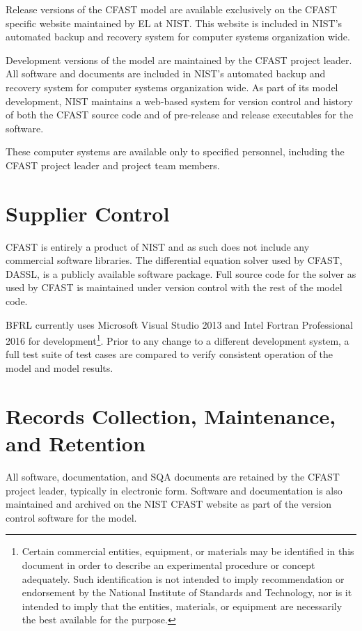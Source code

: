 \documentclass[12pt]{book}
\begin{document}
Release versions of the CFAST model are available exclusively on the CFAST specific website maintained by EL at NIST. This website is included in NIST's automated backup and recovery system for computer systems organization wide.

Development versions of the model are maintained by the CFAST project leader.  All software and documents are included in NIST's automated backup and recovery system for computer systems organization wide. As part of its model development, NIST maintains a web-based system for version control and history of both the CFAST source code and of pre-release and release executables for the software.

These computer systems are available only to specified personnel, including the CFAST project leader and project team members.

\section{Supplier Control}

CFAST is entirely a product of NIST and as such does not include any commercial software libraries. The differential equation solver used by CFAST, DASSL, is a publicly available software package.  Full source code for the solver as used by CFAST is maintained under version control with the rest of the model code.

BFRL currently uses Microsoft Visual Studio 2013 and Intel Fortran Professional 2016 for development\footnote{Certain commercial entities, equipment, or materials may be identified in this document
in order to describe an experimental procedure or concept adequately. Such identification is not intended to imply recommendation or endorsement by the National Institute of Standards and Technology, nor is it intended to imply that the entities, materials, or equipment are necessarily the best available for the purpose.}.  Prior to any change to a different development system, a full test suite of test cases are compared to verify consistent operation of the model and model results.

\section{Records Collection, Maintenance, and Retention}

All software, documentation, and SQA documents are retained by the CFAST project leader, typically in electronic form. Software and documentation is also maintained and archived on the NIST CFAST website as part of the version control software for the model.
\end{document}
